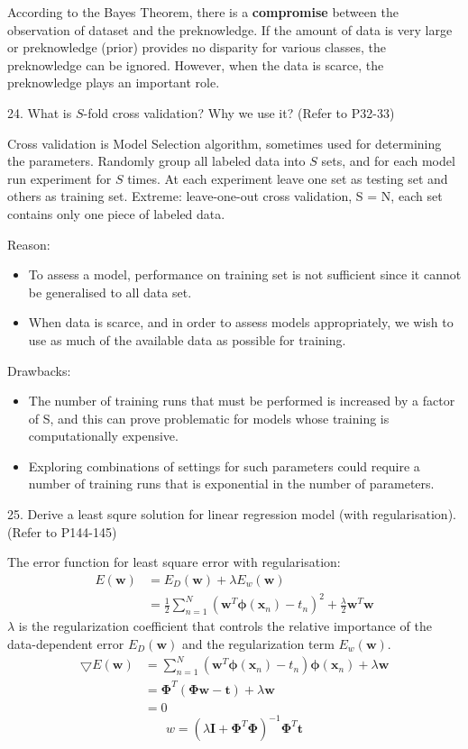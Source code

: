 \documentclass[11pt,a4paper]{article}
\newcommand{\bs}[1]{\boldsymbol{#1}}
\newcommand{\bx}{\boldsymbol{x}}
\newcommand{\BOLD}[1]{\textbf{#1}}
\newcommand{\half}{\frac{1}{2}}
\begin{document}
    According to the Bayes Theorem, there is a \BOLD{compromise} between the observation of dataset and the preknowledge. If the amount of data is very large or preknowledge (prior) provides no disparity for various classes, the preknowledge can be ignored. However, when the data is scarce, the preknowledge plays an important role.

    24. What is $S$-fold cross validation? Why we use it? (Refer to P32-33)
    
    Cross validation is Model Selection algorithm, sometimes used for determining the parameters. Randomly group all labeled data into $S$ sets, and for each model run experiment for $S$ times. At each experiment leave one set as testing set and others as training set. Extreme: leave-one-out cross validation, S = N, each set contains only one piece of labeled data.

    Reason: 
    \begin{itemize}
    \item To assess a model, performance on training set is not sufficient since it cannot be generalised to all data set.
    \item When data is scarce, and in order to assess models appropriately, we wish to use as much of the available data as possible for training.
\end{itemize}

Drawbacks:
    \begin{itemize}
    \item The number of training runs that must be performed is increased by a factor of S, and this can prove problematic for models whose training is computationally expensive.
    \item Exploring combinations of settings for such parameters could require a number of training runs that is exponential in the number of parameters.
    \end{itemize}

25. Derive a least squre solution for linear regression model (with regularisation). (Refer to P144-145)
\newcommand{\bw}{\bs{w}}
\newcommand{\bPhi}{\bs{\Phi}}
\newcommand{\bphi}{\bs{\phi}}

    
    The error function for least square error with regularisation:
    \begin{align}
        E(\bw) &= E_D(\bw) + \lambda E_w(\bw) \\
               &= \half \sum_{n=1}^{N} ( \bw^T \bphi(\bx_n) - t_n)^2 + \frac{\lambda}{2} \bw^T \bw 
    \end{align}
    $\lambda$ is the regularization coefficient that controls the relative importance of the data-dependent error $E_D (\bw)$ and the regularization term $E_w (\bw)$.
    \begin{align}
        \bigtriangledown E(\bw) &= \sum_{n=1}^{N} ( \bw^T \bphi(\bx_n) - t_n) \bphi(\bx_n) + \lambda \bw  \\
         &= \bPhi^T (\bPhi \bw - \bs{t}) + \lambda \bw \\
         &= 0
    \end{align}
    $$
    w = (\lambda \bs{I} + \bPhi^T \bPhi)^{-1} \bPhi^T \bs{t}
    $$
\end{document}
